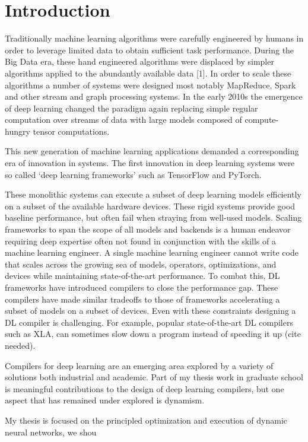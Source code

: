 \chapter{Introduction}
\label{ch:intro}

Traditionally machine learning algorithms were carefully engineered by humans
in order to leverage limited data to obtain sufficient task performance.
During the Big Data era, these hand engineered algorithms were displaced by simpler algorithms applied
to the abundantly available data [1]. In order to scale these algorithms a number of systems were
designed most notably MapReduce, Spark and other stream and graph processing systems.
In the early 2010s the emergence of deep learning changed the paradigm again replacing simple regular
computation over streams of data with large models composed of compute-hungry tensor computations.

This new generation of machine learning applications demanded a corresponding era of innovation in systems.
The first innovation in deep learning systems were so called ‘deep learning frameworks’ such
as TensorFlow and PyTorch.

These monolithic systems can execute a subset of deep learning models
efficiently on a subset of the available hardware devices. These rigid systems provide good baseline
performance, but often fail when straying from well-used models.
Scaling frameworks to span the scope of all models and backends is a human endeavor
requiring deep expertise often not found in conjunction with the skills of a machine learning engineer.
A single machine learning engineer cannot write code that scales across the growing sea of models,
operators, optimizations, and devices while maintaining state-of-the-art performance.
To combat this, DL frameworks have introduced compilers to close the performance gap.
These compilers have made similar tradeoffs to those of frameworks accelerating a subset of models
on a subset of devices. Even with these constraints designing a DL compiler is challenging.
For example, popular state-of-the-art DL compilers such as XLA, can sometimes slow down a program
instead of speeding it up (cite needed).

Compilers for deep learning are an emerging area explored by a variety of solutions both
industrial and academic.
Part of my thesis work in graduate school is meaningful contributions to
the design of deep learning compilers, but one aspect that has remained under explored is dynamism.

My thesis is focused on the principled optimization and execution of dynamic neural networks, we shou

